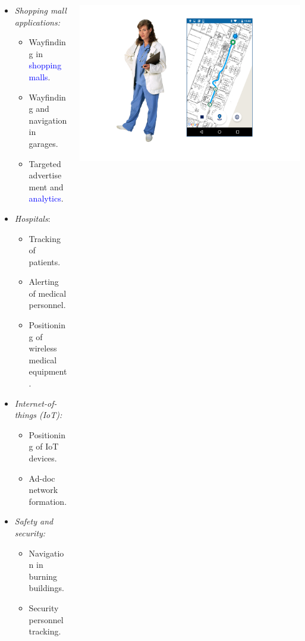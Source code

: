 \documentclass[xcolor=svgnames,english,presentation]{beamer}
\newcommand{\balert}[1]{\textcolor{blue}{#1}}
\begin{document}
\begin{frame}
\begin{columns}
\begin{column}{0.7\textwidth}
\begin{itemize}[<+->]
  \item {\em Shopping mall applications:}
    \begin{itemize}[<+->]  
  	\item \alert{Wayfinding} in \balert{shopping malls}.
	\item Wayfinding and navigation in \alert{garages}.
  	\item Targeted \alert{advertisement} and \balert{analytics}.
    \end{itemize}
  \item {\em Hospitals}:
    \begin{itemize}[<+->]  
      \item Tracking of \alert{patients}.
      \item Alerting of \alert{medical personnel}. 
      \item Positioning of \alert{wireless medical equipment}. 
    \end{itemize}
  \item {\em Internet-of-things (IoT):}
    \begin{itemize}[<+->]    
      \item Positioning of \alert{IoT devices}.
      \item \alert{Ad-doc network} formation.
    \end{itemize}
  \item {\em Safety and security:}
    \begin{itemize}[<+->]    
      \item Navigation in \alert{burning buildings}.
      \item \alert{Security personnel} tracking.
    \end{itemize}
  \end{itemize}
  \end{column}
  \begin{column}{0.3\textwidth}
  \includegraphics[width=0.8\columnwidth]{nurse_nav} \\

\end{column}
\end{columns}
\end{frame}
\end{document}
